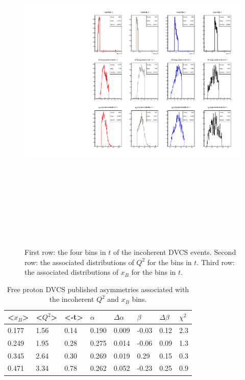 \begin{figure}[h!]
   \centering
   \includegraphics[height=17.0cm]{4D-incoh-bin/4D-t_InCoh_bins.pdf}
   \caption{ First row: the four bins in $t$ of the incoherent DVCS events.  
   Second row: the associated distributions of $Q^2$ for the bins in $t$.  
   Third row: the associated distributions of $x_B$ for the bins in $t$.}
\label{fig:incoh_t-bins-freep}
\end{figure}




\begin {table}[!h]
\begin{center}
\begin{tabular}{|l|l|l|l|l|l|l|l|}
\hline
<$x_{B}$> & <$Q^2$> & <-t> & $\alpha$ & $\Delta \alpha$ &  $\beta$ & $\Delta 
   \beta$ & $\chi^{2}$\\
\hline
0.177 & 1.56 & 0.14 & 0.190 & 0.009 & -0.03 & 0.12  & 2.3\\
\hline
0.249 & 1.95 & 0.28 & 0.275 & 0.014 & -0.06 & 0.09  & 1.3\\
\hline
0.345 & 2.64 & 0.30 & 0.269 & 0.019 & 0.29 & 0.15  & 0.3\\
\hline
0.471 & 3.34 & 0.78 & 0.262 & 0.052 & -0.23 & 0.25  & 0.9\\
\hline
\end{tabular}
   \caption{Free proton DVCS published asymmetries associated with the 
   incoherent $Q^{2}$ and $x_{B}$ bins.}
\label{Table:freeproton-x_Q2_bins}
\end{center}
\end{table}


